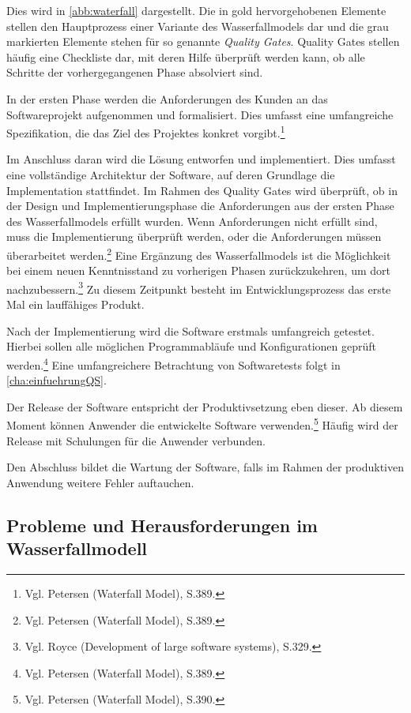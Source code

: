 
        Dies wird in \autoref{abb:waterfall} dargestellt. Die in gold hervorgehobenen Elemente stellen den Hauptprozess einer Variante des Wasserfallmodels dar und die grau markierten Elemente stehen für so genannte \emph{Quality Gates}. Quality Gates stellen häufig eine Checkliste dar, mit deren Hilfe überprüft werden kann, ob alle Schritte der vorhergegangenen Phase absolviert sind.

        In der ersten Phase werden die Anforderungen des Kunden an das Softwareprojekt aufgenommen und formalisiert. Dies umfasst eine umfangreiche Spezifikation, die das Ziel des Projektes konkret vorgibt.\footnote{Vgl. Petersen (Waterfall Model), S.389.}

        Im Anschluss daran wird die Lösung entworfen und implementiert. Dies umfasst eine vollständige Architektur der Software, auf deren Grundlage die Implementation stattfindet. Im Rahmen des Quality Gates wird überprüft, ob in der Design und Implementierungsphase die Anforderungen aus der ersten Phase des Wasserfallmodels erfüllt wurden. Wenn Anforderungen nicht erfüllt sind, muss die Implementierung überprüft werden, oder die Anforderungen müssen überarbeitet werden.\footnote{Vgl. Petersen (Waterfall Model), S.389.}
        Eine Ergänzung des Wasserfallmodels ist die Möglichkeit bei einem neuen Kenntnisstand zu vorherigen Phasen zurückzukehren, um dort nachzubessern.\footnote{Vgl. Royce (Development of large software systems), S.329.}
        Zu diesem Zeitpunkt besteht im Entwicklungsprozess das erste Mal ein lauffähiges Produkt.

        Nach der Implementierung wird die Software erstmals umfangreich getestet. Hierbei sollen alle möglichen Programmabläufe und Konfigurationen geprüft werden.\footnote{Vgl. Petersen (Waterfall Model), S.389.} Eine umfangreichere Betrachtung von Softwaretests folgt in \autoref{cha:einfuehrungQS}.

        Der Release der Software entspricht der Produktivsetzung eben dieser. Ab diesem Moment können Anwender die entwickelte Software verwenden.\footnote{Vgl. Petersen (Waterfall Model), S.390.} Häufig wird der Release mit Schulungen für die Anwender verbunden.

        Den Abschluss bildet die Wartung der Software, falls im Rahmen der produktiven Anwendung weitere Fehler auftauchen.

        \subsection{Probleme und Herausforderungen im Wasserfallmodell}

